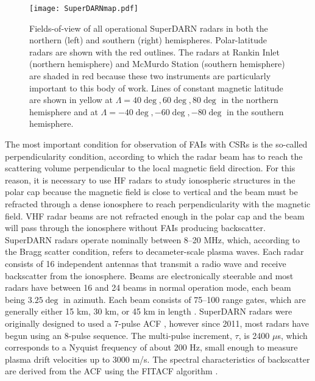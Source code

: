 \begin{figure}
	\centering
	\texttt{[image: SuperDARNmap.pdf]}
	\caption[SuperDARN map]{Fields-of-view of all operational SuperDARN radars in both the northern (left) and southern (right) hemispheres.  Polar-latitude radars are shown with the red outlines.  The radars at Rankin Inlet (northern hemisphere) and McMurdo Station (southern hemisphere) are shaded in red because these two instruments are particularly important to this body of work.  Lines of constant magnetic latitude are shown in yellow at \(\Lambda = 40\deg, 60\deg, 80\deg\) in the northern hemisphere and at \(\Lambda = -40\deg,-60\deg,-80\deg\) in the southern hemisphere.}
	\label{fig:superdarnmap}
\end{figure}

The most important condition for observation of FAIs with CSRs is the so-called perpendicularity condition, according to which the radar beam has to reach the scattering volume perpendicular to the local magnetic field direction.  For this reason, it is necessary to use HF radars to study ionospheric structures in the polar cap because the magnetic field is close to vertical and the beam must be refracted through a dense ionosphere to reach perpendicularity with the magnetic field.  VHF radar beams are not refracted enough in the polar cap and the beam will pass through the ionosphere without FAIs producing backscatter.  SuperDARN radars operate nominally between 8--20 MHz, which, according to the Bragg scatter condition, refers to decameter-scale plasma waves.  Each radar consists of 16 independent antennas that transmit a radio wave and receive backscatter from the ionosphere.  Beams are electronically steerable and most radars have between 16 and 24 beams in normal operation mode, each beam being \(3.25\deg\) in azimuth.  Each beam consists of 75--100 range gates, which are generally either 15 km, 30 km, or 45 km in length \citep{Chisham2007}.  SuperDARN radars were originally designed to used a 7-pulse ACF \citep{Farley1972,Greenwald1983,Greenwald1985}, however since 2011, most radars have begun using an 8-pulse sequence.   The multi-pulse increment, \(\tau\), is 2400 \(\mu\)s, which corresponds to a Nyquist frequency of about 200 Hz, small enough to measure plasma drift velocities up to 3000 m/s.  The spectral characteristics of backscatter are derived from the ACF using the FITACF algorithm \citep{Ponomarenko2006}.

